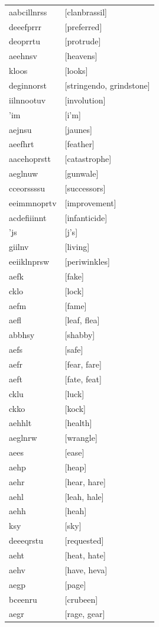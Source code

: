 \documentclass{article}
\begin{document}
\begin{tabular}{ll}
aabcillnrss & [clanbrassil] \\
deeefprrr & [preferred] \\
deoprrtu & [protrude] \\
aeehnsv & [heavens] \\
kloos & [looks] \\
deginnorst & [stringendo, grindstone] \\
iilnnootuv & [involution] \\
'im & [i'm] \\
aejnsu & [jaunes] \\
aeefhrt & [feather] \\
aacehoprstt & [catastrophe] \\
aeglnuw & [gunwale] \\
cceorssssu & [successors] \\
eeimmnoprtv & [improvement] \\
acdefiiinnt & [infanticide] \\
'js & [j's] \\
giilnv & [living] \\
eeiiklnprsw & [periwinkles] \\
aefk & [fake] \\
cklo & [lock] \\
aefm & [fame] \\
aefl & [leaf, flea] \\
abbhsy & [shabby] \\
aefs & [safe] \\
aefr & [fear, fare] \\
aeft & [fate, feat] \\
cklu & [luck] \\
ckko & [kock] \\
aehhlt & [health] \\
aeglnrw & [wrangle] \\
aees & [ease] \\
aehp & [heap] \\
aehr & [hear, hare] \\
aehl & [leah, hale] \\
aehh & [heah] \\
ksy & [sky] \\
deeeqrstu & [requested] \\
aeht & [heat, hate] \\
aehv & [have, heva] \\
aegp & [page] \\
bceenru & [crubeen] \\
aegr & [rage, gear] \\

\end{tabular}
\end{document}
